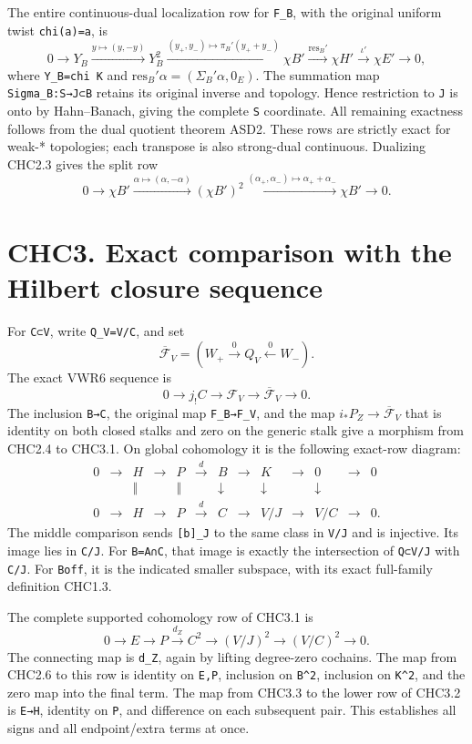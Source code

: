 The entire continuous-dual localization row for \texttt{F\_B}, with the
original uniform twist \texttt{chi(a)=a}, is \[
0\to Y_B\xrightarrow{y\mapsto(y,-y)}Y_B^2
\xrightarrow{(y_+,y_-)\mapsto\pi_B'(y_++y_-)}\chi B'
\xrightarrow{\mathrm{res}_B'}\chi H'
\xrightarrow{\iota'}\chi E'\to0,
\tag{CHC2.7}
\] where \texttt{Y\_B=chi\ K\textquotesingle{}} and
\(\mathrm{res}_B'\alpha=(\Sigma_B'\alpha,0_E)\). The summation map
\texttt{Sigma\_B:S→J⊂B} retains its original inverse and topology. Hence
restriction to \texttt{J} is onto by Hahn--Banach, giving the complete
\texttt{S\textquotesingle{}} coordinate. All remaining exactness follows
from the dual quotient theorem ASD2. These rows are strictly exact for
weak-* topologies; each transpose is also strong-dual continuous.
Dualizing CHC2.3 gives the split row \[
0\to\chi B'\xrightarrow{\alpha\mapsto(\alpha,-\alpha)}
(\chi B')^2\xrightarrow{(\alpha_+,\alpha_-)\mapsto\alpha_++\alpha_-}
\chi B'\to0.
\tag{CHC2.8}
\]

\section{CHC3. Exact comparison with the Hilbert closure
sequence}\label{chc3.-exact-comparison-with-the-hilbert-closure-sequence}

For \texttt{C⊂V}, write \texttt{Q\_V=V/C}, and set \[
\overline{\mathcal F}_V=(W_+\xrightarrow0Q_V\xleftarrow0W_-).
\] The exact VWR6 sequence is \[
0\to j_!C\to\mathcal F_V\to\overline{\mathcal F}_V\to0.
\tag{CHC3.1}
\] The inclusion \texttt{B→C}, the original map \texttt{F\_B→F\_V}, and
the map \(i_*P_Z\to\overline{\mathcal F}_V\) that is identity on both
closed stalks and zero on the generic stalk give a morphism from CHC2.4
to CHC3.1. On global cohomology it is the following exact-row diagram:
\[
\begin{array}{ccccccccccccc}
0&\to&H&\to&P&\xrightarrow d&B&\to&K&\to&0&\to&0\\
&&\Vert&&\Vert&&\downarrow&&\downarrow&&\downarrow\\
0&\to&H&\to&P&\xrightarrow d&C&\to&V/J&\to&V/C&\to&0.
\end{array}
\tag{CHC3.2}
\] The middle comparison sends \texttt{{[}b{]}\_J} to the same class in
\texttt{V/J} and is injective. Its image lies in \texttt{C/J}. For
\texttt{B=A∩C}, that image is exactly the intersection of \texttt{Q⊂V/J}
with \texttt{C/J}. For \texttt{Boff}, it is the indicated smaller
subspace, with its exact full-family definition CHC1.3.

The complete supported cohomology row of CHC3.1 is \[
0\to E\to P\xrightarrow{d_Z}C^2
\to(V/J)^2\to(V/C)^2\to0.
\tag{CHC3.3}
\] The connecting map is \texttt{d\_Z}, again by lifting degree-zero
cochains. The map from CHC2.6 to this row is identity on \texttt{E,P},
inclusion on \texttt{B\^{}2}, inclusion on \texttt{K\^{}2}, and the zero
map into the final term. The map from CHC3.3 to the lower row of CHC3.2
is \texttt{E→H}, identity on \texttt{P}, and difference on each
subsequent pair. This establishes all signs and all endpoint/extra terms
at once.

